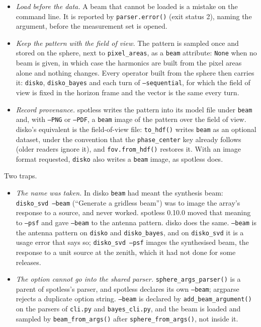 \documentclass[11pt,a4paper]{article}
\begin{document}
\begin{itemize}
\item \emph{Load before the data.} A beam that cannot be loaded is a mistake
  on the command line. It is reported by \texttt{parser.error()} (exit
  status 2), naming the argument, before the measurement set is opened.
\item \emph{Keep the pattern with the field of view.} The pattern is sampled
  once and stored on the sphere, next to \texttt{pixel\_areas}, as a
  \texttt{beam} attribute: \texttt{None} when no beam is given, in which case
  the harmonics are built from the pixel areas alone and nothing changes.
  Every operator built from the sphere then carries it: \texttt{disko},
  \texttt{disko\_bayes} and each turn of \texttt{--sequential}, for which
  the field of view is fixed in the horizon frame and the vector is the same
  every turn.
\item \emph{Record provenance.} spotless writes the pattern into its model
  file under \texttt{beam} and, with \texttt{--PNG} or \texttt{--PDF}, a
  \texttt{beam} image of the pattern over the field of view. disko's
  equivalent is the field-of-view file: \texttt{to\_hdf()} writes
  \texttt{beam} as an optional dataset, under the convention that the
  \texttt{phase\_center} key already follows (older readers ignore it), and
  \texttt{fov.from\_hdf()} restores it. With an image format requested,
  \texttt{disko} also writes a \texttt{beam} image, as spotless does.
\end{itemize}

Two traps.

\begin{itemize}
\item \emph{The name was taken.} In disko \texttt{beam} had meant the
  synthesis beam: \texttt{disko\_svd --beam} (``Generate a gridless beam'')
  was to image the array's response to a source, and never worked. spotless
  0.10.0 moved that meaning to \texttt{--psf} and gave \texttt{--beam} to the
  antenna pattern. disko does the same. \texttt{--beam} is the antenna
  pattern on \texttt{disko} and \texttt{disko\_bayes}, and on
  \texttt{disko\_svd} it is a usage error that says so;
  \texttt{disko\_svd --psf} images the synthesised beam, the response to a
  unit source at the zenith, which it had not done for some releases.
\item \emph{The option cannot go into the shared parser.}
  \texttt{sphere\_args\_parser()} is a parent of spotless's parser, and
  spotless declares its own \texttt{--beam}; argparse rejects a duplicate
  option string. \texttt{--beam} is declared by
  \texttt{add\_beam\_argument()} on the parsers of \texttt{cli.py} and
  \texttt{bayes\_cli.py}, and the beam is loaded and sampled by
  \texttt{beam\_from\_args()} after \texttt{sphere\_from\_args()}, not inside
  it.
\end{itemize}
\end{document}
